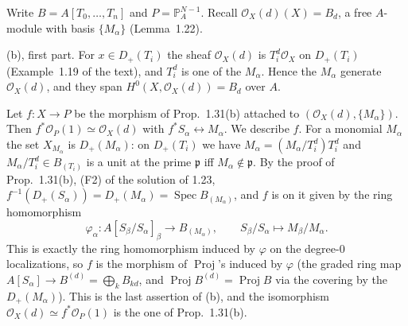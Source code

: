 \documentclass[11pt]{article}
\begin{document}
\pf
Write $B=A[T_0,\dots,T_n]$ and $P=\mathbb{P}^{N-1}_A$. Recall $\mathcal{O}_X(d)(X)=B_d$, a free $A$-module with basis $\{M_\alpha\}$ (Lemma~1.22).

(b), first part. For $x\in D_+(T_i)$ the sheaf $\mathcal{O}_X(d)$ is $T_i^d\mathcal{O}_X$ on $D_+(T_i)$ (Example~1.19 of the text), and $T_i^d$ is one of the $M_\alpha$. Hence the $M_\alpha$ generate $\mathcal{O}_X(d)$, and they span $H^0(X,\mathcal{O}_X(d))=B_d$ over $A$.

Let $f:X\to P$ be the morphism of Prop.~1.31(b) attached to $(\mathcal{O}_X(d),\{M_\alpha\})$. Then $f^*\mathcal{O}_P(1)\simeq\mathcal{O}_X(d)$ with $f^*S_\alpha\leftrightarrow M_\alpha$. We describe $f$. For a monomial $M_\alpha$ the set $X_{M_\alpha}$ is $D_+(M_\alpha)$: on $D_+(T_i)$ we have $M_\alpha=(M_\alpha/T_i^d)T_i^d$ and $M_\alpha/T_i^d\in B_{(T_i)}$ is a unit at the prime $\mathfrak{p}$ iff $M_\alpha\notin\mathfrak{p}$. By the proof of Prop.~1.31(b), (F2) of the solution of 1.23, $f^{-1}(D_+(S_\alpha))=D_+(M_\alpha)=\operatorname{Spec}B_{(M_\alpha)}$, and $f$ is on it given by the ring homomorphism
\[ \varphi_\alpha:A[S_\beta/S_\alpha]_\beta\to B_{(M_\alpha)},\qquad S_\beta/S_\alpha\mapsto M_\beta/M_\alpha. \]
This is exactly the ring homomorphism induced by $\varphi$ on the degree-$0$ localizations, so $f$ is the morphism of $\operatorname{Proj}$'s induced by $\varphi$ (the graded ring map $A[S_\alpha]\to B^{(d)}=\bigoplus_kB_{kd}$, and $\operatorname{Proj}B^{(d)}=\operatorname{Proj}B$ via the covering by the $D_+(M_\alpha)$). This is the last assertion of (b), and the isomorphism $\mathcal{O}_X(d)\simeq f^*\mathcal{O}_P(1)$ is the one of Prop.~1.31(b).
\end{document}
